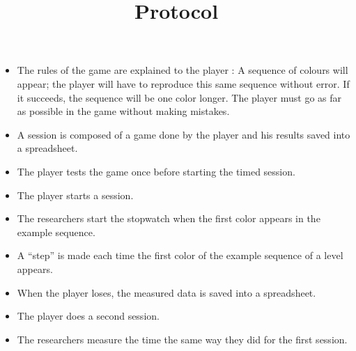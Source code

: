 \documentclass[12pt, openany, twocolumn]{article}
\begin{document}
            \noindent \title{\textbf{Protocol}}
                \begin{itemize}
                \renewcommand\labelitemi{--}
                    \item{The rules of the game are explained to the player : A sequence of colours will appear; the player will have to reproduce this same sequence without error. If it succeeds, the sequence will be one color longer. The player must go as far as possible in the game without making mistakes.}
                    \item{A session is composed of a game done by the player and his results saved into a spreadsheet.}
                    \item{The player tests the game once before starting the timed session.}  
                    \item{The player starts a session.}
                    \item{The researchers start the stopwatch when the first color appears in the example sequence.} 
                    \item{A ``step'' is made each time the first color of the example sequence of a level appears.} 
                    \item{When the player loses, the measured data is saved into a spreadsheet.} 
                    \item{The player does a second session.}
                    \item{The researchers measure the time the same way they did for the first session.}
                \end{itemize}
    

\end{document}
